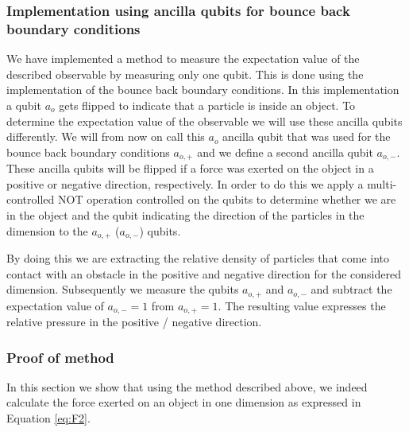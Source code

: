 \subsubsection{Implementation using ancilla qubits for bounce back boundary conditions}
We have implemented a method to measure the expectation value of the described observable by measuring only one qubit. This is done using the implementation of the bounce back boundary conditions. In this implementation a qubit $a_{o}$ gets flipped to indicate that a particle is inside an object. To determine the expectation value of the observable we will use these ancilla qubits differently. We will from now on call this $a_{o}$ ancilla qubit that was used for the bounce back boundary conditions $a_{o,+}$ and we define a second ancilla qubit $a_{o,-}$. These ancilla qubits will be flipped if a force was exerted on the object in a positive or negative direction, respectively. In order to do this we apply a multi-controlled NOT operation controlled on the  qubits to determine whether we are in the object and the qubit indicating the direction of the particles in the dimension to the $a_{o,+}$ ($a_{o,-}$) qubits.  

By doing this we are extracting the relative density of particles that come into contact with an obstacle in the positive and negative direction for the considered dimension. Subsequently we measure the qubits $a_{o,+}$ and $a_{o,-}$ and subtract the expectation value of $a_{o,-}=1$ from $a_{o,+} = 1$. The resulting value expresses the relative pressure in the positive / negative direction. 

\subsubsection{Proof of method}
In this section we show that using the method described above, we indeed calculate the force exerted on an object in one dimension as expressed in Equation \eqref{eq:F2}.

